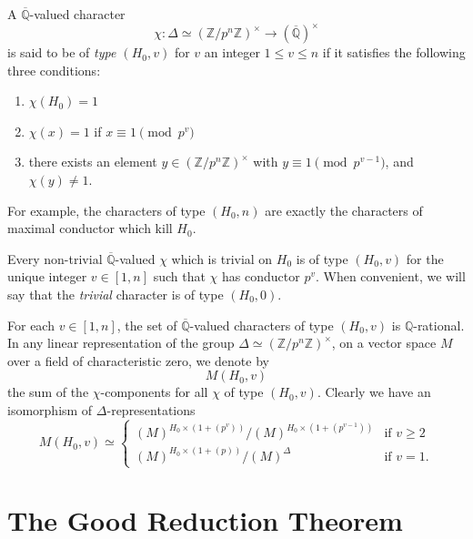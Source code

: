 \kmitem\label{item:14.4.2} A $\overline{\mathbb{Q}}$-valued character
\[
\chi : \Delta \simeq (\mathbb{Z}/p^n\mathbb{Z})^\times \longrightarrow (\overline{\mathbb{Q}})^\times
\]
is said to be of \emph{type $(H_0, v)$} for $v$ an integer $1 \le v \le n$ if it satisfies the following three conditions:
\begin{enumerate}[label=\arabic*)]
\item $\chi(H_0) = 1$
\item $\chi(x) = 1$ if $x \equiv 1 \pmod{p^v}$
\item there exists an element $y \in (\mathbb{Z}/p^n\mathbb{Z})^\times$ with $y \equiv 1 \pmod{p^{v-1}}$, and $\chi(y) \ne 1$.
\end{enumerate}
For example, the characters of type $(H_0, n)$ are exactly the characters of maximal conductor which kill $H_0$.

Every non-trivial $\overline{\mathbb{Q}}$-valued $\chi$ which is trivial on $H_0$ is of type $(H_0, v)$ for the unique integer $v \in [1,n]$ such that $\chi$ has conductor $p^v$. When convenient, we will say that the \emph{trivial} character is of type $(H_0, 0)$.

\kmitem\label{item:14.4.3} For each $v \in [1,n]$, the set of $\overline{\mathbb{Q}}$-valued characters of type $(H_0, v)$ is $\mathbb{Q}$-rational. In any linear representation of the group $\Delta \simeq (\mathbb{Z}/p^n\mathbb{Z})^\times$, on a vector space $M$ over a field of characteristic zero, we denote by
\begin{equation}\label{eq:14.4.3.1}
M(H_0, v)
\end{equation}
the sum of the $\chi$-components for all $\chi$ of type $(H_0, v)$. Clearly we have an isomorphism of $\Delta$-representations
\begin{equation}\label{eq:14.4.3.2}
M(H_0, v) \simeq \begin{cases}
(M)^{H_0 \times (1+(p^v))} / (M)^{H_0 \times (1+(p^{v-1}))} & \text{if } v \ge 2 \\[10pt]
(M)^{H_0 \times (1+(p))} / (M)^\Delta & \text{if } v = 1 .
\end{cases}
\end{equation}

\section{The Good Reduction Theorem}
\label{sec:14.5}

